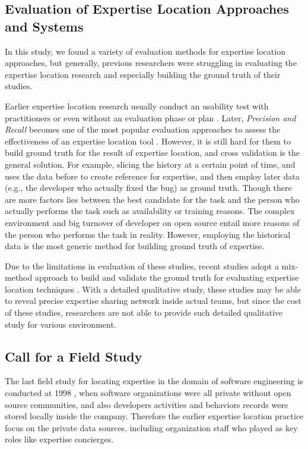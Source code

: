 \subsection{Evaluation of Expertise Location Approaches and Systems}

In this study, we found a variety of evaluation methods for expertise location approaches, but generally, previous researchers were struggling in evaluating the expertise location research and especially building the ground truth of their studies.

Earlier expertise location research usually conduct an usability test with practitioners \cite{mockus2002expertise} or even without an evaluation phase or plan \cite{nardi2002integrating, mcdonald2000expertise}. Later, \textit{Precision and Recall} becomes one of the most popular evaluation approaches to assess the effectiveness of an expertise location tool \cite{Anvik2006who, xu2016predicting, yu2016reviewer}. However, it is still hard for them to build ground truth for the result of expertise location, and cross validation is the general solution. For example, slicing the history at a certain point of time, and uses the data before to create reference for expertise, and then employ later data (e.g., the developer who actually fixed the bug) as ground truth. Though there are more factors lies between the best candidate for the task and the person who actually performs the task such as availability or training reasons. The complex environment and big turnover of developer on open source entail more reasons of the person who performs the task in reality. However, employing the historical data is the most generic method for building ground truth of expertise.

Due to the limitations in evaluation of these studies, recent studies adopt a mix-method approach to build and validate the ground truth for evaluating expertise location techniques \cite{yu2016reviewer, costa2016tipmerge, xu2016predicting}. With a detailed qualitative study, these studies may be able to reveal precise expertise sharing network inside actual teams, but since the cost of these studies, researchers are not able to provide such detailed qualitative study for various environment.

\subsection{Call for a Field Study}

The last field study for locating expertise in the domain of software engineering is conducted at 1998 \cite{mcdonald1998just}, when software organizations were all private without open source communities, and also developers activities and behaviors records were stored locally inside the company. Therefore the earlier expertise location practice focus on the private data sources, including organization staff who played as key roles like expertise concierges.

